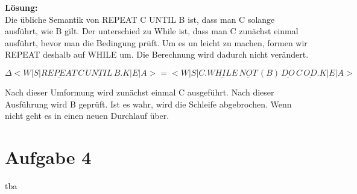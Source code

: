 \documentclass[11pt,a4paper,ngerman]{article}
\begin{document}
\textbf{Lösung:}\\

Die übliche Semantik von REPEAT C UNTIL B ist, dass man C solange ausführt, wie B gilt. Der unterschied zu While ist, dass man C zunächst einmal ausführt, bevor man die Bedingung prüft. Um es un leicht zu machen, formen wir REPEAT deshalb auf WHILE um. Die Berechnung wird dadurch nicht verändert.

$$
\Delta < W | S | \underline{REPEAT}\, C \, \underline{UNTIL}\, B . K | E | A> = <W | S | C . \underline{WHILE} \, \underline{NOT} \, (B)\,  \underline{DO} \, C \, \underline{OD} . K | E | A >
$$

Nach dieser Umformung wird zunächst einmal C ausgeführt. Nach dieser Ausführung wird B geprüft. Ist es wahr, wird die Schleife abgebrochen. Wenn nicht geht es in einen neuen Durchlauf über.

\section*{Aufgabe 4}

tba

\label{LastPage}
\end{document}

